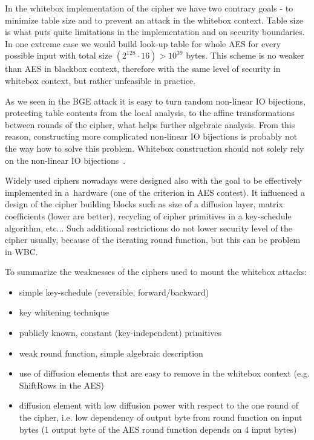 \documentclass[11pt,oneside,final]{fithesis2}
\begin{document}
    In the whitebox implementation of the cipher we have two contrary goals - to minimize table size and to prevent an attack in the whitebox context. Table size is what puts quite limitations
    in the implementation and on security boundaries. In one extreme case we would build look-up table for whole AES for every possible input with total size 
    $\left(2^{128} \cdot 16\right) > 10^{39}$ bytes. This 
    scheme is no weaker than AES in blackbox context, therefore with the same level of security in whitebox context, but rather unfeasible in practice.

    As we seen in the BGE attack it is easy to turn random non-linear IO bijections, protecting table contents from the local analysis, to the affine transformations between rounds of
    the cipher, what helps further algebraic analysis. From this reason, constructing more complicated non-linear IO bijections is probably not the way how to solve this problem. Whitebox construction
    should not solely rely on the non-linear IO bijections~\citep{Billet:2004:CWB:2080787.2080809, Michiels:2007:MST:1314276.1314291}.
    
    Widely used ciphers nowadays were designed also with the goal to be effectively implemented in a~hardware (one of the criterion in AES contest). 
    It influenced a design of the cipher building blocks such as
    size of a diffusion layer, matrix coefficients (lower are better), recycling of cipher primitives in a key-schedule algorithm, etc...
    Such additional restrictions do not lower security level of the cipher usually, because of the iterating round function, but this can be problem in WBC.
    
    To summarize the weaknesses of the ciphers used to mount the whitebox attacks:
    \begin{itemize}
     \item simple key-schedule (reversible, forward/backward)
     \item key whitening technique
     \item publicly known, constant (key-independent) primitives
     \item weak round function, simple algebraic description
     \item use of diffusion elements that are easy to remove in the whitebox context (e.g. ShiftRows in the AES)
     \item diffusion element with low diffusion power with respect to the one round of the cipher, i.e. low dependency of 
	    output byte from round function on input bytes (1 output byte of the AES round function depends on 4 input bytes)
    \end{itemize}
    
\end{document}
